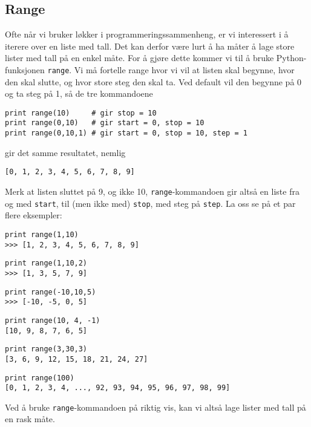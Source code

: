 \documentclass[a4paper, 11pt, notitlepage, english]{article}
\begin{document}
\subsection{Range}
Ofte når vi bruker løkker i programmeringssammenheng, er vi interessert i å iterere over en liste med tall. Det kan derfor være lurt å ha måter å lage store lister med tall på en enkel måte. For å gjøre dette kommer vi til å bruke Python-funksjonen \verb+range+. Vi må fortelle range hvor vi vil at listen skal begynne, hvor den skal slutte, og hvor store steg den skal ta. Ved default vil den begynne på 0 og ta steg på 1, så de tre kommandoene
\begin{lstlisting}
print range(10)     # gir stop = 10
print range(0,10)   # gir start = 0, stop = 10
print range(0,10,1) # gir start = 0, stop = 10, step = 1
\end{lstlisting}
\vspace{-0.3cm}
gir det samme resultatet, nemlig
\begin{lstlisting}
[0, 1, 2, 3, 4, 5, 6, 7, 8, 9]
\end{lstlisting}
\vspace{-0.3cm}
Merk at listen sluttet på 9, og ikke 10, \verb+range+-kommandoen gir altså en liste fra og med \verb+start+, til (men ikke med) \verb+stop+, med steg på \verb+step+. La oss se på et par flere eksempler:
\begin{lstlisting}
print range(1,10)
>>> [1, 2, 3, 4, 5, 6, 7, 8, 9]
\end{lstlisting}
\vspace{-0.3cm}
\begin{lstlisting}
print range(1,10,2)
>>> [1, 3, 5, 7, 9]
\end{lstlisting}
\vspace{-0.3cm}
\begin{lstlisting}
print range(-10,10,5)
>>> [-10, -5, 0, 5]
\end{lstlisting}
\vspace{-0.3cm}
\begin{lstlisting}
print range(10, 4, -1)
[10, 9, 8, 7, 6, 5]
\end{lstlisting}
\vspace{-0.3cm}
\begin{lstlisting}
print range(3,30,3)
[3, 6, 9, 12, 15, 18, 21, 24, 27]
\end{lstlisting}
\vspace{-0.3cm}
\begin{lstlisting}
print range(100)
[0, 1, 2, 3, 4, ..., 92, 93, 94, 95, 96, 97, 98, 99]
\end{lstlisting}
\vspace{-0.3cm}
Ved å bruke \verb+range+-kommandoen på riktig vis, kan vi altså lage lister med tall på en rask måte.
\end{document}

